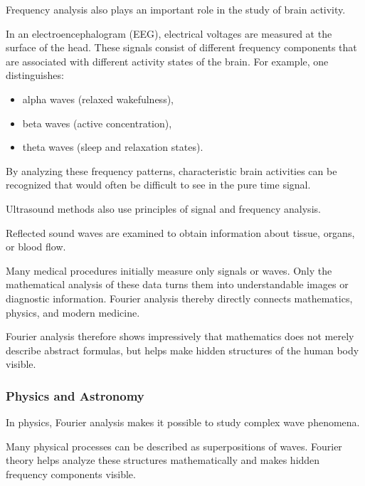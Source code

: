 Frequency analysis also plays an important role
in the study of brain activity.

In an electroencephalogram (EEG),
electrical voltages are measured at the surface of the head.
These signals consist of different frequency components
that are associated with different activity states of the brain.
\newpage
\noindent
For example, one distinguishes:

\begin{itemize}
	\item alpha waves (relaxed wakefulness),
	\item beta waves (active concentration),
	\item theta waves (sleep and relaxation states).
\end{itemize}

By analyzing these frequency patterns,
characteristic brain activities can be recognized
that would often be difficult to see in the pure time signal.

Ultrasound methods also use principles of signal and frequency analysis.

Reflected sound waves are examined
to obtain information about tissue,
organs,
or blood flow.

Many medical procedures initially measure only signals or waves.
Only the mathematical analysis of these data
turns them into understandable images or diagnostic information.
Fourier analysis thereby directly connects mathematics,
physics,
and modern medicine.

Fourier analysis therefore shows impressively
that mathematics does not merely describe abstract formulas,
but helps make hidden structures of the human body visible.

\subsubsection*{Physics and Astronomy}

In physics, Fourier analysis makes it possible to study complex wave phenomena.

Many physical processes can be described as superpositions of waves.
Fourier theory helps analyze these structures mathematically
and makes hidden frequency components visible.

\medskip

